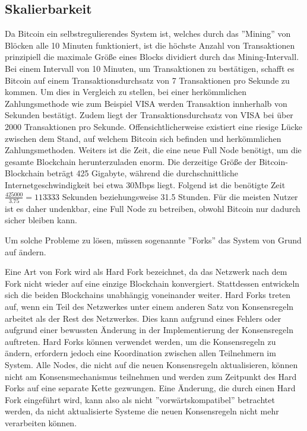 \subsection{Skalierbarkeit}
Da Bitcoin ein selbstregulierendes System ist, welches durch das ''Mining'' von Blöcken alle 10 Minuten funktioniert, ist die
höchste Anzahl von Transaktionen prinzipiell die maximale Größe eines Blocks dividiert durch das Mining-Intervall. Bei einem
Intervall von 10 Minuten, um Transaktionen zu bestätigen, schafft es Bitcoin auf einem Transaktionsdurchsatz von 7 Transaktionen 
pro Sekunde zu kommen. Um dies in Vergleich zu stellen, bei einer herkömmlichen Zahlungsmethode wie zum Beispiel VISA werden
Transaktion innherhalb von Sekunden bestätigt. Zudem liegt der Transaktionsdurchsatz von VISA bei über 2000 Transaktionen pro
Sekunde. Offensichtlicherweise existiert eine riesige Lücke zwischen dem Stand, auf welchem Bitcoin sich befinden und
herkömmlichen Zahlungsmethoden.  Weiters ist die Zeit, die eine neue Full Node benötigt, um die gesamte 
Blockchain herunterzuladen enorm. Die derzeitige Größe der Bitcoin-Blockchain beträgt 425 Gigabyte, während die
durchschnittliche Internetgeschwindigkeit bei etwa 30Mbps liegt. Folgend ist die benötigte Zeit \(\frac{425000}{3.75} = 113333\)
Sekunden beziehungsweise 31.5 Stunden. Für die meisten Nutzer ist es daher undenkbar, eine Full Node zu betreiben, obwohl Bitcoin
nur dadurch sicher bleiben kann. 

Um solche Probleme zu lösen, müssen sogenannte ''Forks'' das System von Grund auf ändern.

Eine Art von Fork wird als Hard Fork bezeichnet, da das Netzwerk nach dem Fork nicht wieder auf eine einzige Blockchain 
konvergiert. Stattdessen entwickeln sich die beiden Blockchains unabhängig voneinander weiter. Hard Forks treten auf, wenn ein 
Teil des Netzwerkes unter einem anderen Satz von Konsensregeln arbeitet als der Rest des Netzwerkes. Dies kann aufgrund eines
Fehlers oder aufgrund einer bewussten Änderung in der Implementierung der Konsensregeln auftreten. Hard Forks können verwendet
werden, um die Konsensregeln zu ändern, erfordern jedoch eine Koordination zwischen allen Teilnehmern im System. Alle Nodes,
die nicht auf die neuen Konsensregeln aktualisieren, können nicht am Konsensmechanismus teilnehmen und werden zum Zeitpunkt des
Hard Forks auf eine separate Kette gezwungen. Eine Änderung, die durch einen Hard Fork eingeführt wird, kann also als nicht
''vorwärtskompatibel'' betrachtet werden, da nicht aktualisierte Systeme die neuen Konsensregeln nicht mehr verarbeiten können.

